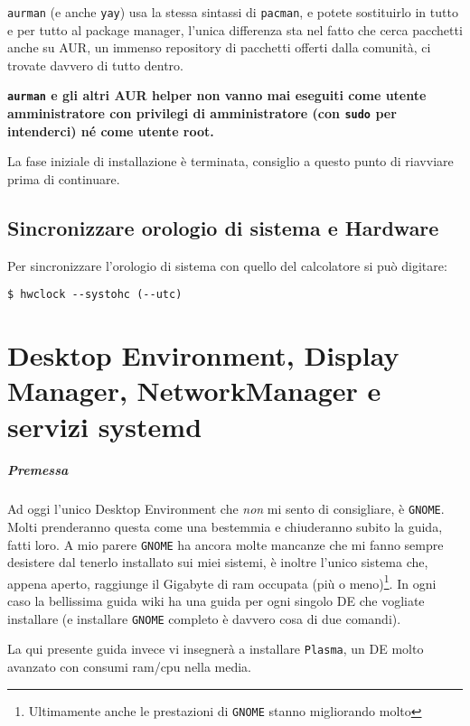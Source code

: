 \documentclass[twoside,italian]{book}
\newcommand{\code}[1]{\texttt{#1}}
\begin{document}
    \code{aurman} (e anche \code{yay}) usa la stessa sintassi di \code{pacman}, e potete sostituirlo in tutto e per tutto al package manager, l'unica differenza sta nel fatto che cerca pacchetti anche su \ac{AUR}, un immenso repository di pacchetti offerti dalla comunità, ci trovate davvero di tutto dentro. 
    
    \begin{center}
        \textbf{\code{aurman} e gli altri \ac{AUR} helper non vanno mai eseguiti come utente amministratore con privilegi di amministratore (con \code{sudo} per intenderci) né come utente root.}
    \end{center}
    
    La fase iniziale di installazione è terminata, consiglio a questo punto di riavviare prima di continuare.
    
    
\section{Sincronizzare orologio di sistema e Hardware}
    Per sincronizzare l'orologio di sistema con quello del calcolatore si può digitare:
    \begin{lstlisting}
$ hwclock --systohc (--utc)
    \end{lstlisting}

\chapter[DE e altri servizi]{Desktop Environment, Display Manager, NetworkManager e servizi systemd}

\paragraph{Premessa} Ad oggi l'unico Desktop Environment che \emph{non} mi sento di consigliare, è \code{GNOME}. Molti prenderanno questa come una bestemmia e chiuderanno subito la guida, fatti loro. A mio parere \code{GNOME} ha ancora molte mancanze che mi fanno sempre desistere dal tenerlo installato sui miei sistemi, è inoltre l'unico sistema che, appena aperto, raggiunge il Gigabyte di ram occupata (più o meno)\footnote{Ultimamente anche le prestazioni di \code{GNOME} stanno migliorando molto}. In ogni caso la bellissima guida wiki ha una guida per ogni singolo DE che vogliate installare (e installare \code{GNOME} completo è davvero cosa di due comandi).

La qui presente guida invece vi insegnerà a installare \code{Plasma}, un \ac{DE} molto avanzato con consumi ram/cpu nella media.
\end{document}
